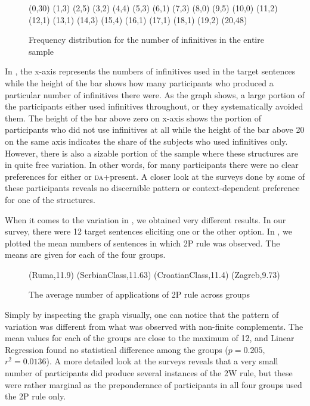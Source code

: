 \documentclass[output=paper,modfonts,newtxmath,hidelinks,]{langscibook}
\begin{document}
\begin{figure}[h]
\footnotesize
\textsf{
%
{
(0,30) (1,3) (2,5) (3,2) (4,4) (5,3) (6,1) (7,3) (8,0) (9,5) (10,0) (11,2) (12,1) (13,1) (14,3) (15,4) (16,1) (17,1) (18,1) (19,2) (20,48)
}}
\caption{Frequency distribution for the number of infinitives in the entire sample}\label{7:fig:key:2}
\end{figure}


In , the x-axis represents the numbers of infinitives used in the target sentences while the height of the bar shows how many participants who produced a particular number of infinitives there were. As the graph shows, a large portion of the participants either used infinitives throughout, or they systematically avoided them. The height of the bar above zero on x-axis shows the portion of participants who did not use infinitives at all while the height of the bar above 20 on the same axis indicates the share of the subjects who used infinitives only. However, there is also a sizable portion of the sample where these structures are in quite free variation. In other words, for many participants there were no clear preferences for either  or \textsc{da}+present. A closer look at the surveys done by some of these participants reveals no discernible pattern or context-dependent preference for one of the structures. 

When it comes to the variation in , we obtained very different results. In our survey, there were 12 target sentences eliciting one or the other  option. In , we plotted the mean numbers of sentences in which 2P rule was observed. The means are given for each of the four groups.

  
\begin{figure}[h]
\footnotesize
\textsf{
%
{
(Ruma,11.9)
(SerbianClass,11.63)
(CroatianClass,11.4)
(Zagreb,9.73)
}}
\caption{The average number of applications of 2P rule across groups}\label{7:fig:key:3}
\end{figure}

\largerpage%
Simply by inspecting the graph visually, one can notice that the pattern of variation was different from what was observed with non-finite complements. The mean values for each of the groups are close to the maximum of 12, and Linear Regression found no statistical difference among the groups ($p=0.205,$ $r^2 = 0.0136$). A more detailed look at the surveys reveals that a very small number of participants did produce several instances of the 2W rule, but these were rather marginal as the preponderance of participants in all four groups used the 2P rule only. 
\end{document}
